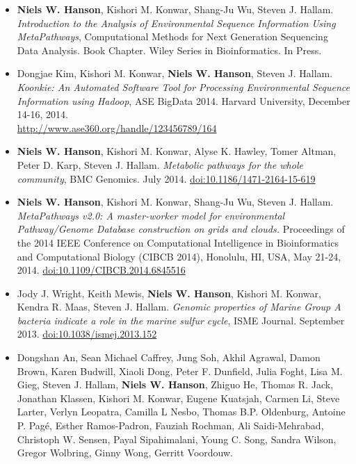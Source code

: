 \documentclass[print]{hanson_cv} %
\begin{document}
\begin{itemize}
\item
  \textbf{Niels W. Hanson}, Kishori M. Konwar, Shang-Ju Wu, Steven J. Hallam. \emph{Introduction to the Analysis of Environmental Sequence Information Using MetaPathways}, Computational Methods for Next Generation Sequencing Data Analysis. Book Chapter. Wiley Series in Bioinformatics. In Press.
\item
  Dongjae Kim, Kishori M. Konwar, \textbf{Niels W. Hanson}, Steven J.
  Hallam. \emph{Koonkie: An Automated Software Tool for Processing
  Environmental Sequence Information using Hadoop}, ASE BigData 2014.
  Harvard University, December 14-16,
  2014.\\\href{http://www.ase360.org/handle/123456789/164}{http://www.ase360.org/handle/123456789/164}
\item
  \textbf{Niels W. Hanson}, Kishori M. Konwar, Alyse K. Hawley, Tomer
  Altman, Peter D. Karp, Steven J. Hallam. \emph{Metabolic pathways for
  the whole community}, BMC Genomics. July 2014.
  \href{http://dx.doi.org/10.1186/1471-2164-15-619}{doi:10.1186/1471-2164-15-619}
\item
  \textbf{Niels W. Hanson}, Kishori M. Konwar, Shang-Ju Wu, Steven J.
  Hallam. \emph{MetaPathways v2.0: A master-worker model for
  environmental Pathway/Genome Database construction on grids and
  clouds.} Proceedings of the 2014 IEEE Conference on Computational
  Intelligence in Bioinformatics and Computational Biology (CIBCB 2014),
  Honolulu, HI, USA, May 21-24, 2014.
  \href{http://ieeexplore.ieee.org/xpl/articleDetails.jsp?arnumber=6845516}{doi:10.1109/CIBCB.2014.6845516}
\item
  Jody J. Wright, Keith Mewis, \textbf{Niels W. Hanson}, Kishori M.
  Konwar, Kendra R. Maas, Steven J. Hallam. \emph{Genomic properties of
  Marine Group A bacteria indicate a role in the marine sulfur cycle},
  ISME Journal. September 2013.
  \href{http://dx.doi.org/10.1038/ismej.2013.152}{doi:10.1038/ismej.2013.152}
\item
  Dongshan An, Sean Michael Caffrey, Jung Soh, Akhil Agrawal, Damon
  Brown, Karen Budwill, Xiaoli Dong, Peter F. Dunfield, Julia Foght,
  Lisa M. Gieg, Steven J. Hallam, \textbf{Niels W. Hanson}, Zhiguo He,
  Thomas R. Jack, Jonathan Klassen, Kishori M. Konwar, Eugene Kuatsjah,
  Carmen Li, Steve Larter, Verlyn Leopatra, Camilla L Nesbo, Thomas B.P.
  Oldenburg, Antoine P. Pag\'{e}, Esther Ramos-Padron, Fauziah Rochman, Ali
  Saidi-Mehrabad, Christoph W. Sensen, Payal Sipahimalani, Young C.
  Song, Sandra Wilson, Gregor Wolbring, Ginny Wong, Gerritt Voordouw.

\end{itemize}
\end{document}
